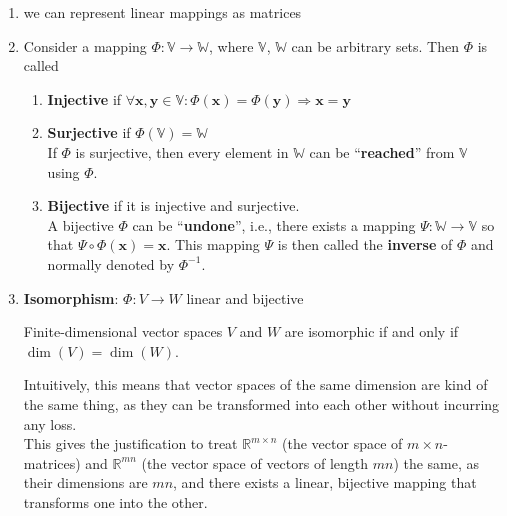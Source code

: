 \begin{enumerate}
    \item we can represent linear mappings as matrices
    \item Consider a mapping $\Phi : \mathbb{V} \to \mathbb{W}$, where $\mathbb{V}$, $\mathbb{W}$ can be arbitrary sets. Then $\Phi$ is called
    \begin{enumerate}
        \item \textbf{Injective} if $\forall \mathbf{x, y} \in \mathbb{V}: \Phi(\mathbf{x}) = \Phi(\mathbf{y}) \Rightarrow \mathbf{x} = \mathbf{y}$ 

        \item \textbf{Surjective} if $\Phi(\mathbb{V}) = \mathbb{W}$\\
        If $\Phi$ is surjective, then every element in $\mathbb{W}$ can be “\textbf{reached}” from $\mathbb{V}$ using $\Phi$.

        \item \textbf{Bijective} if it is injective and surjective.\\
        A bijective $\Phi$ can be “\textbf{undone}”, i.e., there exists a mapping $\Psi : \mathbb{W} \to \mathbb{V}$ so that $\Psi \circ \Phi(\textbf{x}) = \textbf{x}$. This mapping $\Psi$ is then called the \textbf{inverse} of $\Phi$ and normally denoted by $\Phi^{-1}$.
        
    \end{enumerate}

    \item \textbf{Isomorphism}: $\Phi : V \to W$ linear and bijective\\
    
    \begin{theorem}\label{theorem: isomorphic}
        Finite-dimensional vector spaces $V$ and $W$ are isomorphic if and only if $\dim(V) = \dim(W)$.
    \end{theorem}
    
    Intuitively, this means that vector spaces of the same dimension are kind of the same thing, as they can be transformed into each other without incurring any loss.\\
    This gives the justification to treat $\mathbb{R}^{m\times n}$ (the vector space of ${m\times n}$-matrices) and $\mathbb{R}^{mn}$ (the vector space of vectors of length $mn$) the same, as their dimensions are $mn$, and there exists a linear, bijective mapping that transforms one into the other.


\end{enumerate}
